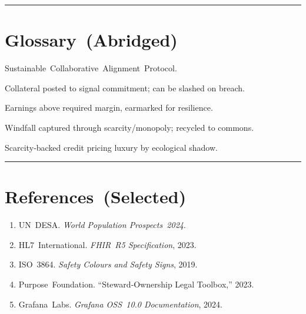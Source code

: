 \bigskip\hrule\bigskip

\section*{Glossary (Abridged)}
\begin{description}[style=nextline]
  \item[SCAP] Sustainable Collaborative Alignment Protocol.
  \item[Stake] Collateral posted to signal commitment; can be slashed on breach.
  \item[Surplus] Earnings above required margin, earmarked for resilience.
  \item[Rent] Windfall captured through scarcity/monopoly; recycled to commons.
  \item[Stewardship Point (SP)] Scarcity‑backed credit pricing luxury by ecological shadow.
\end{description}

\bigskip\hrule\bigskip

\section*{References (Selected)}
\begin{enumerate}[label=\arabic*.]
  \item UN DESA. \emph{World Population Prospects 2024}.
  \item HL7 International. \emph{FHIR R5 Specification}, 2023.
  \item ISO 3864. \emph{Safety Colours and Safety Signs}, 2019.
  \item Purpose Foundation. “Steward‑Ownership Legal Toolbox,” 2023.
  \item Grafana Labs. \emph{Grafana OSS 10.0 Documentation}, 2024.
\end{enumerate}
